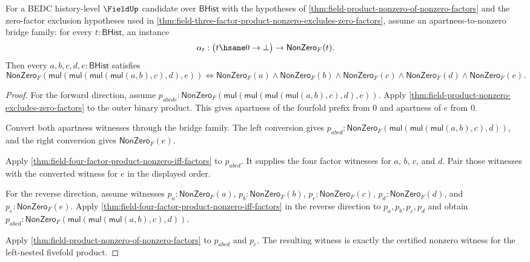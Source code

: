 \begin{theorem}
\label{thm:field-five-factor-product-nonzero-iff-factors}
For a BEDC history-level $\FieldUp$ candidate over $\mathsf{BHist}$ with the
hypotheses of \autoref{thm:field-product-nonzero-of-nonzero-factors} and the
zero-factor exclusion hypotheses used in
\autoref{thm:field-three-factor-product-nonzero-excludes-zero-factors}, assume
an apartness-to-nonzero bridge family: for every $t:\mathsf{BHist}$, an
instance
$$
\alpha_t:\bigl(t\hsame0\to\bot\bigr)\to\mathsf{NonZero}_F(t).
$$
Then every $a,b,c,d,e:\mathsf{BHist}$ satisfies
$$
\mathsf{NonZero}_F(\mathsf{mul}(\mathsf{mul}(\mathsf{mul}(\mathsf{mul}(a,b),c),d),e))
\Longleftrightarrow
\mathsf{NonZero}_F(a)\wedge\mathsf{NonZero}_F(b)\wedge
\mathsf{NonZero}_F(c)\wedge\mathsf{NonZero}_F(d)\wedge
\mathsf{NonZero}_F(e).
$$
\end{theorem}
\begin{proof}
For the forward direction, assume
$p_{abcde}:\mathsf{NonZero}_F(
\mathsf{mul}(\mathsf{mul}(\mathsf{mul}(\mathsf{mul}(a,b),c),d),e))$.
Apply \autoref{thm:field-product-nonzero-excludes-zero-factors} to the outer
binary product. This gives apartness of the fourfold prefix from $0$ and
apartness of $e$ from $0$.

Convert both apartness witnesses through the bridge family. The left conversion
gives
$p_{abcd}:\mathsf{NonZero}_F(\mathsf{mul}(\mathsf{mul}(\mathsf{mul}(a,b),c),d))$,
and the right conversion gives $\mathsf{NonZero}_F(e)$.

Apply \autoref{thm:field-four-factor-product-nonzero-iff-factors} to
$p_{abcd}$. It supplies the four factor witnesses for $a$, $b$, $c$, and $d$.
Pair those witnesses with the converted witness for $e$ in the displayed order.

For the reverse direction, assume witnesses
$p_a:\mathsf{NonZero}_F(a)$, $p_b:\mathsf{NonZero}_F(b)$,
$p_c:\mathsf{NonZero}_F(c)$, $p_d:\mathsf{NonZero}_F(d)$, and
$p_e:\mathsf{NonZero}_F(e)$. Apply
\autoref{thm:field-four-factor-product-nonzero-iff-factors} in the reverse
direction to $p_a,p_b,p_c,p_d$ and obtain
$p_{abcd}:\mathsf{NonZero}_F(\mathsf{mul}(\mathsf{mul}(\mathsf{mul}(a,b),c),d))$.

Apply \autoref{thm:field-product-nonzero-of-nonzero-factors} to $p_{abcd}$ and
$p_e$. The resulting witness is exactly the certified nonzero witness for the
left-nested fivefold product.
\end{proof}

